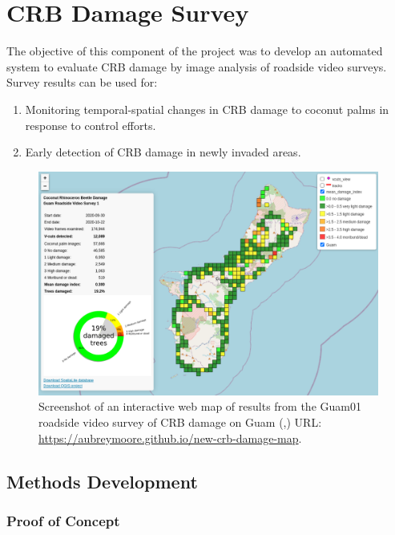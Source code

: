 \documentclass[12pt,letterpaper,english,bibliography=totocnumbered,abstract=on]{scrartcl}
\begin{document}
\newpage
\section{CRB Damage Survey}

The objective of this component of the project was to develop an automated system to evaluate CRB damage by image analysis of roadside video surveys.  Survey results can be used for:
\begin{enumerate}
	\item Monitoring temporal-spatial changes in CRB damage to coconut palms in response to control efforts.
	\item Early detection of CRB damage in newly invaded areas.
\end{enumerate}

\begin{figure}[h]
	\centering
	\includegraphics[width=\linewidth]{images/webmap1}
	\caption{Screenshot of an interactive web map of results from the Guam01 roadside video survey of CRB damage on Guam (\cite{mooreWebMapGuamCRBdamagemap2020102020},\cite{mooreUsingCellPhone2020}) URL: \url{https://aubreymoore.github.io/new-crb-damage-map}.}
	\label{fig:webmap1}
\end{figure}


\subsection{Methods Development}

\subsubsection{Proof of Concept}
\end{document}
